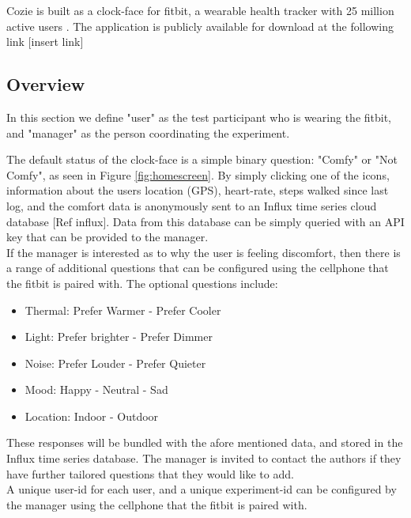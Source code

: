 
Cozie is built as a clock-face for fitbit, a wearable health tracker with 25 million active users \cite{fibit2018}. The application is publicly available for download at the following link [insert link]

\subsection{Overview}

In this section we define "user" as the test participant who is wearing the fitbit, and "manager" as the person coordinating the experiment. \ 

The default status of the clock-face is a simple binary question: "Comfy" or "Not Comfy", as seen in Figure \ref{fig:homescreen}. By simply clicking one of the icons, information about the users location (GPS), heart-rate, steps walked since last log, and the comfort data is anonymously sent to an Influx time series cloud database [Ref influx]. Data from this database can be simply queried with an API key that can be provided to the manager.\\

If the manager is interested as to why the user is feeling discomfort, then there is a range of additional questions that can be configured using the cellphone that the fitbit is paired with. The optional questions include:

\begin{itemize}
  \item Thermal: Prefer Warmer - Prefer Cooler
  \item Light: Prefer brighter - Prefer Dimmer
  \item Noise: Prefer Louder - Prefer Quieter 
  \item Mood: Happy - Neutral - Sad
  \item Location: Indoor - Outdoor
\end{itemize}

These responses will be bundled with the afore mentioned data, and stored in the Influx time series database. The manager is invited to contact the authors if they have further tailored questions that they would like to add.\\

A unique user-id for each user, and a unique experiment-id can be configured by the manager using the cellphone that the fitbit is paired with. \\

